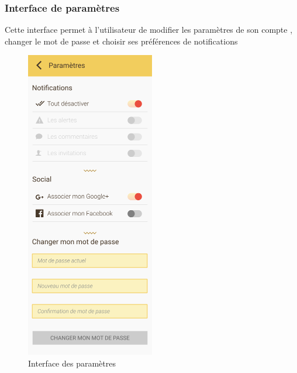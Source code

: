 \documentclass[11pt,a4paper,oneside]{book}
\begin{document}
					\subsubsection{Interface de paramètres}
					Cette interface permet à l’utilisateur de modifier les paramètres de son compte , changer le mot de passe et choisir ses préférences de notifications
					\begin{figure}[H]
						\centering
						\includegraphics[width=0.5\textwidth]{../Maquettes/Hanimo-maquettes/Output/05-My-profile-settings-state-1}
						\caption{Interface des paramètres }
						\label{fig:05-my-profile-settings-state-1}
					\end{figure}
				\vfill
				
\end{document}
